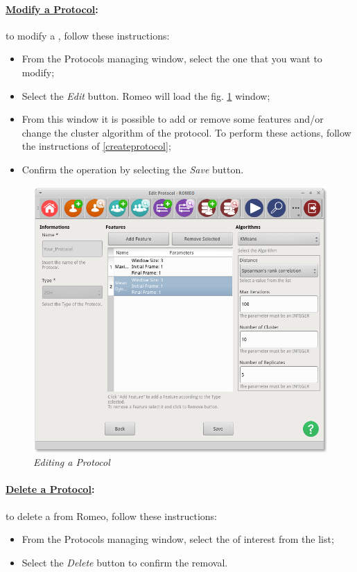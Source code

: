 \paragraph{\underline{Modify a Protocol}:} to modify a \protocol{}, follow these instructions:
\begin{itemize}
\item From the Protocols\g{} managing window, select the one that you want to modify;
\item Select the \textit{Edit} button. Romeo will load the fig. \ref{editprotocol} window;
\item From this window it is possible to add or remove some features and/or change the cluster algorithm of the protocol. To perform these actions, follow the instructions of \ref{createprotocol};
\item Confirm the operation by selecting the \textit{Save} button.
\end{itemize}
\begin{figure}[!h]
\begin{center}
\includegraphics[scale=0.4]{./Images/ManageProtocol}
\caption{\textit{Editing a Protocol}}
\label{editprotocol}
\end{center}
\end{figure}

\paragraph{\underline{Delete a Protocol}:} to delete a \protocol{} from Romeo, follow these instructions:
\begin{itemize}
\item From the Protocols\g{} managing window, select the \protocol{} of interest from the list;
\item Select the \textit{Delete} button to confirm the removal.
\end{itemize}
\pagebreak

